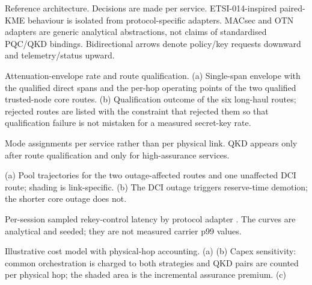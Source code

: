 Reference architecture. Decisions are made per service.
ETSI-014-inspired paired-KME behaviour is isolated from protocol-specific
adapters. MACsec and OTN adapters are generic analytical abstractions, not
claims of standardised PQC/QKD bindings. Bidirectional arrows denote
policy/key requests downward and telemetry/status upward. 

Attenuation-envelope rate and route qualification. (a) Single-span
envelope with the qualified direct spans and the per-hop operating points of
the two qualified trusted-node core routes. (b) Qualification outcome of the
six long-haul routes; rejected routes are listed with the constraint that
rejected them so that qualification failure is not mistaken for a measured
secret-key rate.

Mode assignments per service rather than per physical link. QKD
appears only after route qualification and only for high-assurance services.

(a) Pool trajectories for the two outage-affected routes and one
unaffected DCI route; shading is link-specific. (b)  The DCI outage triggers
reserve-time demotion; the shorter core outage does not.

Per-session sampled rekey-control latency by protocol adapter
. The
curves are analytical and seeded; they are not measured carrier p99 values.

Illustrative cost model with physical-hop accounting. (a)  (b) Capex
sensitivity: common orchestration is charged to both strategies and QKD pairs
are counted per physical hop; the shaded area is the incremental assurance
premium. (c) 


